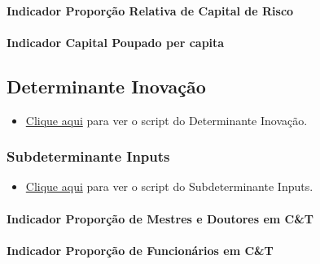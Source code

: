 \documentclass[
  12,
  dvipsnames]{article}
\providecommand{\tightlist}{%
  \setlength{\itemsep}{0pt}\setlength{\parskip}{0pt}}
\begin{document}
\hypertarget{indicador-proporuxe7uxe3o-relativa-de-capital-de-risco}{%
\paragraph{Indicador Proporção Relativa de Capital de
Risco}\label{indicador-proporuxe7uxe3o-relativa-de-capital-de-risco}}

\hypertarget{indicador-capital-poupado-per-capita}{%
\paragraph{Indicador Capital Poupado per
capita}\label{indicador-capital-poupado-per-capita}}

\hypertarget{det_inovacao}{%
\subsection{Determinante Inovação}\label{det_inovacao}}

\begin{itemize}
\tightlist
\item
  \protect\hyperlink{script_2.5}{Clique aqui} para ver o script do
  Determinante Inovação.
\end{itemize}

\hypertarget{subdet_input}{%
\subsubsection{Subdeterminante Inputs}\label{subdet_input}}

\begin{itemize}
\tightlist
\item
  \protect\hyperlink{script_2.5.1}{Clique aqui} para ver o script do
  Subdeterminante Inputs.
\end{itemize}

\hypertarget{indicador-proporuxe7uxe3o-de-mestres-e-doutores-em-ct}{%
\paragraph{Indicador Proporção de Mestres e Doutores em
C\&T}\label{indicador-proporuxe7uxe3o-de-mestres-e-doutores-em-ct}}

\hypertarget{indicador-proporuxe7uxe3o-de-funcionuxe1rios-em-ct}{%
\paragraph{Indicador Proporção de Funcionários em
C\&T}\label{indicador-proporuxe7uxe3o-de-funcionuxe1rios-em-ct}}
\end{document}
